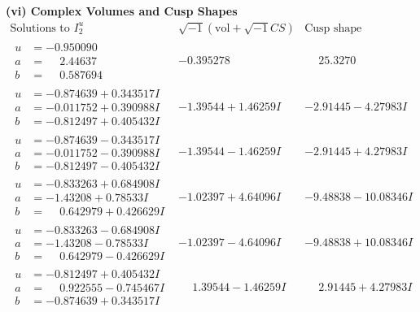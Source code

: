 \documentclass[1p]{elsarticle_modified}
\theoremstyle{definition}
\newcommand{\I}{\sqrt{-1}}
\begin{document}
\newpage\flushleft \textbf{(vi) Complex Volumes and Cusp Shapes}
$$\begin{array}{c|c|c}  
\text{Solutions to }I^u_{2}& \I (\text{vol} + \sqrt{-1}CS) & \text{Cusp shape}\\
 \hline 
\begin{aligned}
u &= -0.950090\phantom{ +0.000000I} \\
a &= \phantom{-}2.44637\phantom{ +0.000000I} \\
b &= \phantom{-}0.587694\phantom{ +0.000000I}\end{aligned}
 & -0.395278\phantom{ +0.000000I} & \phantom{-}25.3270\phantom{ +0.000000I} \\ \hline\begin{aligned}
u &= -0.874639 + 0.343517 I \\
a &= -0.011752 + 0.390988 I \\
b &= -0.812497 + 0.405432 I\end{aligned}
 & -1.39544 + 1.46259 I & -2.91445 - 4.27983 I \\ \hline\begin{aligned}
u &= -0.874639 - 0.343517 I \\
a &= -0.011752 - 0.390988 I \\
b &= -0.812497 - 0.405432 I\end{aligned}
 & -1.39544 - 1.46259 I & -2.91445 + 4.27983 I \\ \hline\begin{aligned}
u &= -0.833263 + 0.684908 I \\
a &= -1.43208 + 0.78533 I \\
b &= \phantom{-}0.642979 + 0.426629 I\end{aligned}
 & -1.02397 + 4.64096 I & -9.48838 - 10.08346 I \\ \hline\begin{aligned}
u &= -0.833263 - 0.684908 I \\
a &= -1.43208 - 0.78533 I \\
b &= \phantom{-}0.642979 - 0.426629 I\end{aligned}
 & -1.02397 - 4.64096 I & -9.48838 + 10.08346 I \\ \hline\begin{aligned}
u &= -0.812497 + 0.405432 I \\
a &= \phantom{-}0.922555 - 0.745467 I \\
b &= -0.874639 + 0.343517 I\end{aligned}
 & \phantom{-}1.39544 - 1.46259 I & \phantom{-}2.91445 + 4.27983 I \\ \hline\begin{aligned}

\end{aligned}
\end{array}$$
\end{document}

